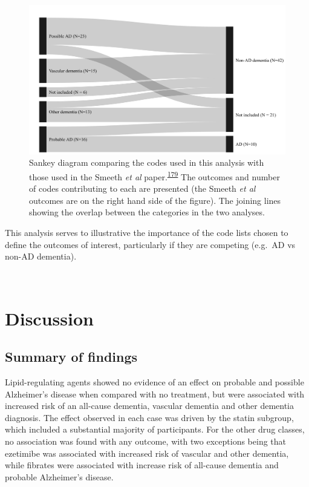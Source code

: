 \documentclass[a4paper, twoside]{templates/ociamthesis}
\begin{document}
~





\begin{figure}[H]
\includegraphics[width=1\linewidth]{figures/cprd-analysis/sankey_diagram} \caption[Comparison of code used in this analysis with those used in the Smeeth et al.~2010 paper]{Sankey diagram comparing the codes used in this analysis with those used in the Smeeth \emph{et al} paper.\textsuperscript{\protect\hyperlink{ref-smeeth2009}{179}} The outcomes and number of codes contributing to each are presented (the Smeeth \emph{et al} outcomes are on the right hand side of the figure). The joining lines showing the overlap between the categories in the two analyses.}\label{fig:smeethComparison}
\end{figure}

This analysis serves to illustrative the importance of the code lists chosen to define the outcomes of interest, particularly if they are competing (e.g.~AD vs non-AD dementia).

~

\hypertarget{discussion-2}{%
\section{Discussion}\label{discussion-2}}

\hypertarget{summary-of-findings-1}{%
\subsection{Summary of findings}\label{summary-of-findings-1}}

Lipid-regulating agents showed no evidence of an effect on probable and possible Alzheimer's disease when compared with no treatment, but were associated with increased risk of an all-cause dementia, vascular dementia and other dementia diagnosis. The effect observed in each case was driven by the statin subgroup, which included a substantial majority of participants. For the other drug classes, no association was found with any outcome, with two exceptions being that ezetimibe was associated with increased risk of vascular and other dementia, while fibrates were associated with increase risk of all-cause dementia and probable Alzheimer's disease.
\end{document}
